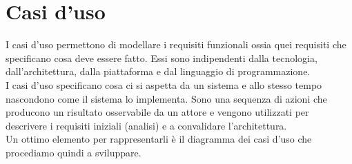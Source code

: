 \documentclass[a4paper, 11pt,oneside,]{book}
\begin{document}
\chapter{Casi d'uso}
    I casi d'uso permettono di modellare i requisiti funzionali ossia quei requisiti che specificano cosa deve essere fatto. Essi sono indipendenti dalla tecnologia,
    dall'architettura, dalla piattaforma e dal linguaggio di programmazione.\\
    I casi d'uso specificano cosa ci si aspetta da un sistema e allo stesso tempo nascondono come il sistema lo implementa. Sono una sequenza di azioni che producono un risultato osservabile da un attore e vengono utilizzati
    per descrivere i requisiti iniziali (analisi) e a convalidare l'architettura.\\
    Un ottimo elemento per rappresentarli è il diagramma dei casi d'uso che procediamo quindi a sviluppare.
\end{document}
